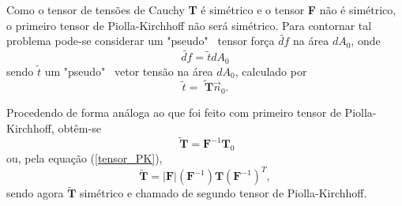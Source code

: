 Como o tensor de tensões de Cauchy \textbf{T} é simétrico e o tensor \textbf{F} não é simétrico, o primeiro tensor de Piolla-Kirchhoff não será simétrico. Para contornar tal problema pode-se considerar um  "pseudo" \ tensor força $ \tilde{df} $ na área $ dA_{0} $, onde
\begin{equation}
	\tilde{df} = \tilde{t} dA_{0}
\end{equation} 
sendo $ \tilde{t} $ um "pseudo" \ vetor tensão na área $ dA_{0} $, calculado por
\begin{equation}
	\tilde{t} =  \tilde{ \textbf{ T}} \vec{n} _{0}.
\end{equation}

Procedendo de forma análoga ao que foi feito com primeiro tensor de Piolla-Kirchhoff, obtêm-se
\begin{equation}
	\tilde{ \textbf{ T}}  = \textbf{F} ^{-1} \textbf{T} _{0}
\end{equation}
ou, pela equação (\ref{tensor_PK}),
\begin{equation}
	\tilde{ \textbf{T}} = \vert \textbf{F} \vert ( \textbf{F} ^{-1}) \textbf{T}   ( \textbf{F} ^{-1}) ^{T},
\end{equation}
sendo agora $ \tilde{ \textbf{T}} $ simétrico e chamado de segundo tensor de Piolla-Kirchhoff.



